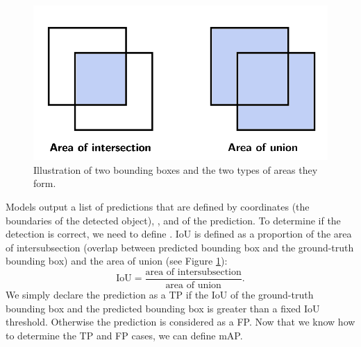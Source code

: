 \begin{figure}[H]
    \centering
    \includegraphics[width=0.6\linewidth]{Sources/Figures/iou.png}
    \caption{Illustration of two bounding boxes and the two types of areas they
        form.}
    \label{fig:iou}
\end{figure}

Models output a list of predictions that are defined by 
coordinates (the boundaries of the detected object), , and
 of the prediction. To determine if the detection is
correct, we need to define . IoU is
defined as a proportion of the area of intersubsection (overlap between
predicted bounding box and the ground-truth bounding box) and the area of union
(see Figure \ref{fig:iou}):
$$
    \text{IoU} = \frac{\text{area of intersubsection}}{\text{area of union}}.
$$
We simply declare the prediction as a TP if the IoU of the ground-truth bounding
box and the predicted bounding box is greater than a fixed IoU threshold.
Otherwise the prediction is considered as a FP. Now that we know how to determine
the TP and FP cases, we can define mAP.

